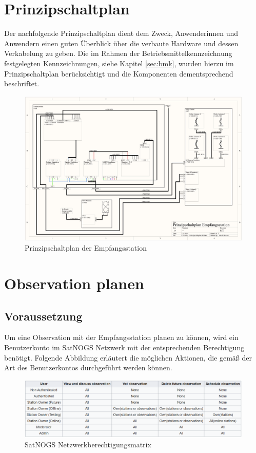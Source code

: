 \section{Prinzipschaltplan}
Der nachfolgende Prinzipschaltplan dient dem Zweck, Anwenderinnen und Anwendern einen guten Überblick über die verbaute Hardware und dessen Verkabelung zu geben. Die im Rahmen der Betriebsmittelkennzeichnung festgelegten Kennzeichnungen, siehe Kapitel \ref{sec:bmk}, wurden hierzu im Prinzipschaltplan berücksichtigt und die Komponenten dementsprechend beschriftet. 

\begin{landscape}
	\begin{figure}
		\centering
		\includegraphics[width=\linewidth]{../ref/Prinzipschaltplan.jpg}
		\caption{Prinzipschaltplan der Empfangsstation}
		\label{fig:prinzipschaltplan}
	\end{figure}
\end{landscape}

\section{Observation planen}
\subsection{Voraussetzung}
Um eine Observation mit der Empfangsstation planen zu können, wird ein Benutzerkonto im SatNOGS Netzwerk mit der entsprechenden Berechtigung benötigt. Folgende Abbildung erläutert die möglichen Aktionen, die gemäß der Art des Benutzerkontos durchgeführt werden können.

\begin{figure} [H]
	\centering
	\includegraphics[width=\linewidth]{../ref/network_permission_matrix.png}
	\caption{SatNOGS Netzwerkberechtigungsmatrix \cite{noauthor_operation_nodate}}
	\label{fig:networkpermissionmatrix}
\end{figure}


